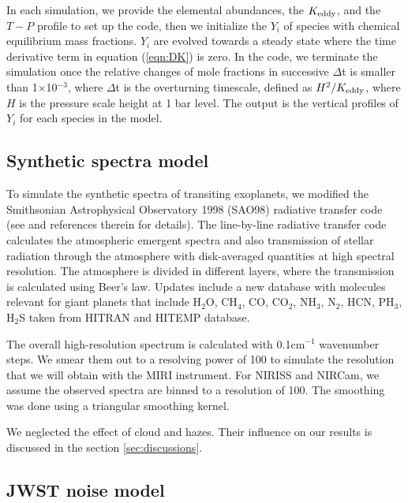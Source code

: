 \documentclass[twocolumn]{aastex61}
\begin{document}
In each simulation, we provide the elemental abundances, the $K_{\rm eddy}$, and the $T-P$ profile to set up the code, then we initialize the $Y_i$ of species with chemical equilibrium mass fractions. $Y_i$ are evolved towards a steady state where the time derivative term in equation (\ref{eqn:DK}) is zero. In the code, we terminate the simulation once the relative changes of mole fractions in successive $\Delta$t is smaller than 1$\times$10$^{-3}$, where $\Delta$t is the overturning timescale, defined as $H^2/K_{\rm eddy}$, where $H$ is the pressure scale height at 1 bar level. The output is the vertical profiles of $Y_i$ for each species in the model.     

\subsection{Synthetic spectra model}
To simulate the synthetic spectra of transiting exoplanets, we modified the Smithsonian Astrophysical Observatory 1998 (SAO98) radiative transfer code (see \citet{ts76,tj02,kt09} and references therein for details). The line-by-line radiative transfer code calculates the atmospheric emergent spectra and also transmission of stellar radiation through the atmosphere with disk-averaged quantities at high spectral resolution.  The atmosphere is divided in different layers, where the transmission is calculated using Beer's law.  Updates include a new database with molecules relevant for giant planets that include H$_2$O, CH$_4$, CO, CO$_2$, NH$_3$, N$_2$, HCN, PH$_3$, H$_2$S taken from HITRAN \citep{r13} and HITEMP \citep{r10} database.  

The overall high-resolution spectrum is calculated with 0.1cm$^{-1}$ wavenumber steps. We smear them out to a resolving power of 100 to simulate the resolution that we will obtain with the MIRI instrument. For NIRISS and NIRCam, we assume the observed spectra are binned to a resolution of 100. The smoothing was done using a triangular smoothing kernel. 

We neglected the effect of cloud and hazes. Their influence on our results is discussed in the section \ref{sec:discussions}.

\subsection{JWST noise model}\label{subsec:noise}
\end{document}
